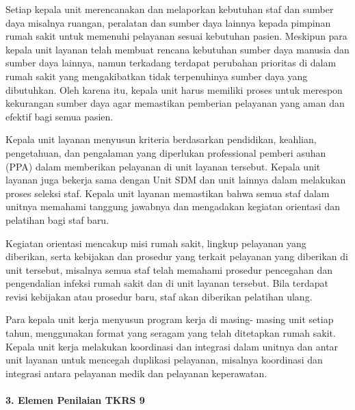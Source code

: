 \documentclass[
]{book}
\begin{document}
Setiap kepala unit merencanakan dan melaporkan kebutuhan staf dan sumber daya misalnya ruangan, peralatan dan sumber daya lainnya kepada pimpinan rumah sakit untuk memenuhi pelayanan sesuai kebutuhan pasien. Meskipun para kepala unit layanan telah membuat rencana kebutuhan sumber daya manusia dan sumber daya lainnya, namun terkadang terdapat perubahan prioritas di dalam rumah sakit yang mengakibatkan tidak terpenuhinya sumber daya yang dibutuhkan. Oleh karena itu, kepala unit harus memiliki proses untuk merespon kekurangan sumber daya agar memastikan pemberian pelayanan yang aman dan efektif bagi semua pasien.

Kepala unit layanan menyusun kriteria berdasarkan pendidikan, keahlian, pengetahuan, dan pengalaman yang diperlukan professional pemberi asuhan (PPA) dalam memberikan pelayanan di unit layanan tersebut. Kepala unit layanan juga bekerja sama dengan Unit SDM dan unit lainnya dalam melakukan proses seleksi staf.
Kepala unit layanan memastikan bahwa semua staf dalam unitnya memahami tanggung jawabnya dan mengadakan kegiatan orientasi dan pelatihan bagi staf baru.

Kegiatan orientasi mencakup misi rumah sakit, lingkup pelayanan yang diberikan, serta kebijakan dan prosedur yang terkait pelayanan yang diberikan di unit tersebut, misalnya semua staf telah memahami prosedur pencegahan dan pengendalian infeksi rumah sakit dan di unit layanan tersebut. Bila terdapat revisi kebijakan atau prosedur baru, staf akan diberikan pelatihan ulang.

Para kepala unit kerja menyusun program kerja di masing- masing unit setiap tahun, menggunakan format yang seragam yang telah ditetapkan rumah sakit. Kepala unit kerja melakukan koordinasi dan integrasi dalam unitnya dan antar unit layanan untuk mencegah duplikasi pelayanan, misalnya koordinasi dan integrasi antara pelayanan medik dan pelayanan keperawatan.

\hypertarget{elemen-penilaian-tkrs-9}{%
\paragraph*{3. Elemen Penilaian TKRS 9}\label{elemen-penilaian-tkrs-9}}
\end{document}
